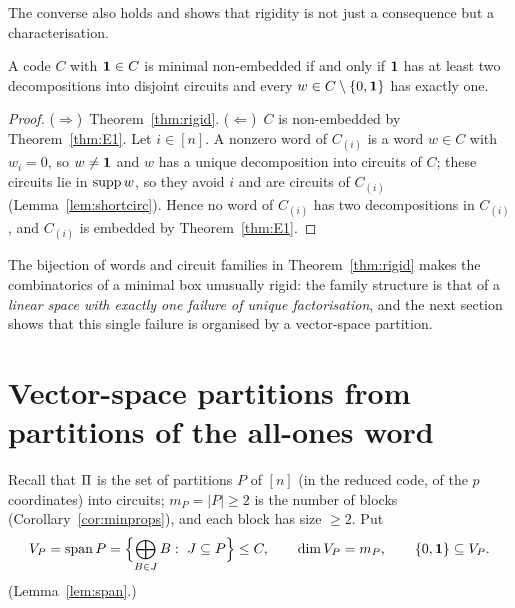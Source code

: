 
The converse also holds and shows that rigidity is not just a consequence but a characterisation.

\begin{proposition}\label{prop:rigid-char}
A code $C$ with $\mathbf 1\in C$ is minimal non-embedded if and only if $\mathbf 1$ has at least two decompositions into disjoint circuits and every $w\in C\setminus\{0,\mathbf 1\}$ has exactly one.
\end{proposition}

\begin{proof}
($\Rightarrow$)~Theorem~\ref{thm:rigid}. ($\Leftarrow$)~$C$ is non-embedded by Theorem~\ref{thm:E1}. Let $i\in[n]$. A nonzero word of $C_{(i)}$ is a word $w\in C$ with $w_i=0$, so $w\ne\mathbf 1$ and $w$ has a unique decomposition into circuits of $C$; these circuits lie in $\operatorname{supp} w$, so they avoid $i$ and are circuits of $C_{(i)}$ (Lemma~\ref{lem:shortcirc}). Hence no word of $C_{(i)}$ has two decompositions in $C_{(i)}$, and $C_{(i)}$ is embedded by Theorem~\ref{thm:E1}.
\end{proof}


The bijection of words and circuit families in Theorem~\ref{thm:rigid} makes the combinatorics of a minimal box unusually rigid: the family structure is that of a \emph{linear space with exactly one failure of unique factorisation}, and the next section shows that this single failure is organised by a vector-space partition.

\section{Vector-space partitions from partitions of the all-ones word}\label{sec:vsp}

Recall that $\Pi$ is the set of partitions $P$ of $[n]$ (in the reduced code, of the $p$ coordinates) into circuits; $m_P=|P|\ge2$ is the number of blocks (Corollary~\ref{cor:minprops}), and each block has size $\ge2$. Put
\[
V_P=\spn P=\Bigl\{\bigoplus_{B\in J}B:\ J\subseteq P\Bigr\}\le C,\qquad\dim V_P=m_P,\qquad\{0,\one\}\subseteq V_P.
\]
(Lemma~\ref{lem:span}.)

